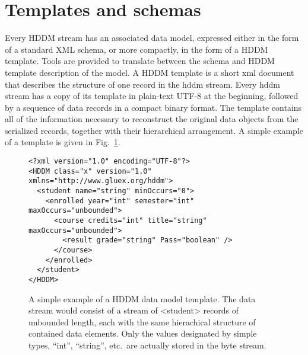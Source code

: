 \documentclass{revtex4}
\begin{document}
\section{Templates and schemas}

Every HDDM stream has an associated data model, expressed either in the form of a
standard XML schema, or more compactly, in the form of a HDDM template.  Tools are
provided to translate between the schema and HDDM template description of the model.
A HDDM template is a short xml document that describes the structure of one record
in the hddm stream. Every hddm stream has a copy of its template in plain-text
UTF-8 at the beginning, followed by a sequence of data records in a compact binary
format. The template contains all of the information necessary to reconstruct the
original data objects from the serialized records, together with their hierarchical
arrangement. A simple example of a template is given in Fig.~\ref{simple_template}.

\begin{figure}
\begin{minipage}{12cm}
\begin{verbatim}
<?xml version="1.0" encoding="UTF-8"?>
<HDDM class="x" version="1.0" xmlns="http://www.gluex.org/hddm">
  <student name="string" minOccurs="0">
    <enrolled year="int" semester="int" maxOccurs="unbounded">
      <course credits="int" title="string" maxOccurs="unbounded">
        <result grade="string" Pass="boolean" />
      </course>
    </enrolled>
  </student>
</HDDM>
\end{verbatim}
\end{minipage}
\caption{\label{simple_template}
A simple example of a HDDM data model template. The data stream would
consist of a stream of <student> records of unbounded length, each with the
same hierachical structure of contained data elements. Only the values designated
by simple types, ``int'', ``string'', etc.\ are actually stored in the byte stream.}
\end{figure}
\end{document}
